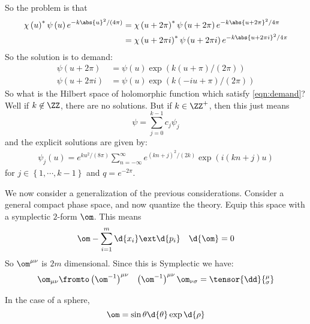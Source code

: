 \documentclass{booc}
\begin{document}
So the problem is that
\begin{align}
\chi\left( u \right)^* \psi\left( u \right)
e^{-k\abs{u}^2 / \left( 4\pi \right)} &=
\chi\left( u + 2\pi \right)^* \psi\left( u + 2\pi \right)
e^{-k\abs{u + 2\pi}^2 / 4\pi} \\
&= \chi\left( u + 2\pi i \right)^* \psi\left( u + 2\pi i \right)
e^{-k\abs{u + 2\pi i}^2 / 4\pi} \\
\end{align}
So the solution is to demand:
\begin{align}
\psi\left( u + 2\pi \right) &=
\psi\left( u \right) \exp\left( k\left( u + \pi \right) / \left( 2\pi \right) \right) \\
\psi\left( u + 2\pi i \right) &=
\psi\left( u \right) \exp\left( k\left( -i u + \pi \right) / \left( 2\pi \right) \right)
\label{eqn:demand}
\end{align}
So what is the Hilbert space of holomorphic function which satisfy
\cref{eqn:demand}?
Well if $k\not\in \ZZ$, there are no solutions. 
But if $k\in \ZZ^+$, then this just means
\begin{equation}
\psi = \sum_{j = 0}^{k-1} c_j \psi_j
\end{equation}
and the explicit solutions are given by:
\begin{align}
\psi_j\left( u \right) = 
e^{k u^2/ \left( 8\pi \right)}
\sum_{n = -\infty}^\infty
e^{\left( kn + j \right)^2 / \left( 2k \right)}
\exp\left( i\left( kn + j \right)u \right)
\end{align}
for $j\in \left\{ 1 , \cdots , k-1 \right\}$
and $q = e^{-2\pi}$. 

We now consider a generalization of the previous considerations.
Consider a general compact phase space, and now quantize the theory. 
Equip this space with a symplectic $2$-form $\om$. This means
\begin{align}
\om - \sum_{i = 1}^m \d{x_i} \ext \d{p_i}
&& \d{\om} = 0
\end{align}
So $\om^{\mu\nu}$ is $2m$ dimensional.
Since this is Symplectic we have:
\begin{align}
\om_{\mu\nu} \fromto \left( \om^{-1} \right)^{\mu\nu}
&&
\left( \om^{-1} \right)^{\mu\nu} \om_{\nu\sigma} = \tensor{\dd}{^\mu_\sigma}
\end{align}

\begin{exm}
In the case of a sphere, 
\begin{equation}
\om = \sin\theta \d{\theta} \exp \d{\rho}
\end{equation}
\end{exm}
\end{document}
